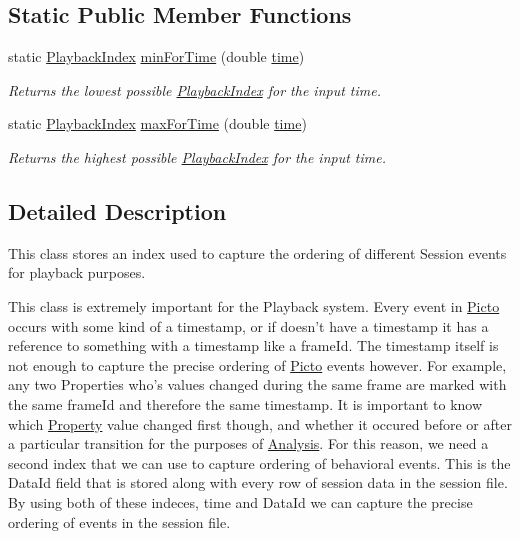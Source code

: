 \subsection*{Static Public Member Functions}
\begin{DoxyCompactItemize}
\item 
\hypertarget{struct_picto_1_1_playback_index_a4e258793e5728ac68f0c58037955e4c3}{static \hyperlink{struct_picto_1_1_playback_index}{Playback\-Index} \hyperlink{struct_picto_1_1_playback_index_a4e258793e5728ac68f0c58037955e4c3}{min\-For\-Time} (double \hyperlink{struct_picto_1_1_playback_index_acbf8f826cfd64d647a098ed165dd3999}{time})}\label{struct_picto_1_1_playback_index_a4e258793e5728ac68f0c58037955e4c3}

\begin{DoxyCompactList}\small\item\em Returns the lowest possible \hyperlink{struct_picto_1_1_playback_index}{Playback\-Index} for the input time. \end{DoxyCompactList}\item 
\hypertarget{struct_picto_1_1_playback_index_a87e6a7f297deaada4698add28d39476e}{static \hyperlink{struct_picto_1_1_playback_index}{Playback\-Index} \hyperlink{struct_picto_1_1_playback_index_a87e6a7f297deaada4698add28d39476e}{max\-For\-Time} (double \hyperlink{struct_picto_1_1_playback_index_acbf8f826cfd64d647a098ed165dd3999}{time})}\label{struct_picto_1_1_playback_index_a87e6a7f297deaada4698add28d39476e}

\begin{DoxyCompactList}\small\item\em Returns the highest possible \hyperlink{struct_picto_1_1_playback_index}{Playback\-Index} for the input time. \end{DoxyCompactList}\end{DoxyCompactItemize}


\subsection{Detailed Description}
This class stores an index used to capture the ordering of different Session events for playback purposes. 

This class is extremely important for the Playback system. Every event in \hyperlink{namespace_picto}{Picto} occurs with some kind of a timestamp, or if doesn't have a timestamp it has a reference to something with a timestamp like a frame\-Id. The timestamp itself is not enough to capture the precise ordering of \hyperlink{namespace_picto}{Picto} events however. For example, any two Properties who's values changed during the same frame are marked with the same frame\-Id and therefore the same timestamp. It is important to know which \hyperlink{class_picto_1_1_property}{Property} value changed first though, and whether it occured before or after a particular transition for the purposes of \hyperlink{class_picto_1_1_analysis}{Analysis}. For this reason, we need a second index that we can use to capture ordering of behavioral events. This is the Data\-Id field that is stored along with every row of session data in the session file. By using both of these indeces, time and Data\-Id we can capture the precise ordering of events in the session file.

